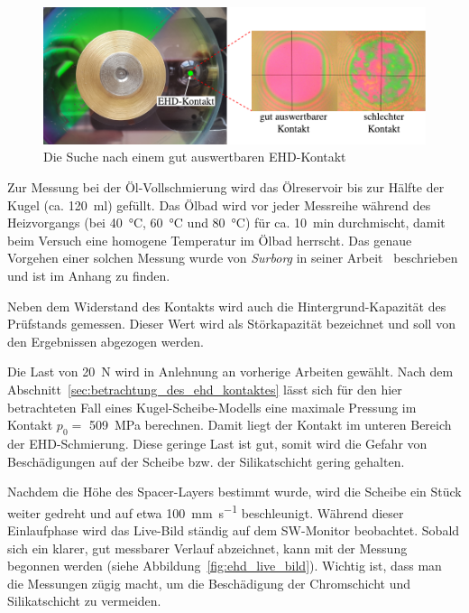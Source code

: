 \begin{figure}[htb]
    \centering
    \includegraphics[]{./images/suche_nach_ehd_kontakt.pdf}
    \caption{Die Suche nach einem gut auswertbaren EHD-Kontakt}
    \label{fig:suche_nach_ehd_kontakt}
\end{figure}

Zur Messung bei der Öl-Vollschmierung wird das Ölreservoir bis zur Hälfte der Kugel (ca. \SI{120}{\ml}) gefüllt.
Das Ölbad wird vor jeder Messreihe während des Heizvorgangs (bei \SI{40}{\degreeCelsius}, \SI{60}{\degreeCelsius} und \SI{80}{\degreeCelsius}) für ca. \SI{10}{\minute} durchmischt, damit beim Versuch eine homogene Temperatur im Ölbad herrscht.
Das genaue Vorgehen einer solchen Messung wurde von \textit{Surborg} in seiner Arbeit~\cite{surborg_2007} beschrieben und ist im Anhang zu finden.

Neben dem Widerstand des Kontakts wird auch die Hintergrund-Kapazität des Prüfstands gemessen.
Dieser Wert wird als Störkapazität bezeichnet und soll von den Ergebnissen abgezogen werden.

Die Last von \SI{20}{\newton} wird in Anlehnung an vorherige Arbeiten gewählt.
Nach dem Abschnitt~\ref{sec:betrachtung_des_ehd_kontaktes} lässt sich für den hier betrachteten Fall eines Kugel-Scheibe-Modells eine maximale Pressung im Kontakt $p_0 =$ \SI{509}{\mega\pascal} berechnen.
Damit liegt der Kontakt im unteren Bereich der EHD-Schmierung.
Diese geringe Last ist gut, somit wird die Gefahr von Beschädigungen auf der Scheibe bzw. der Silikatschicht gering gehalten.

Nachdem die Höhe des Spacer-Layers bestimmt wurde, wird die Scheibe ein Stück weiter gedreht und auf etwa \SI[per-mode=symbol]{100}{\mm\per\second} beschleunigt.
Während dieser Einlaufphase wird das Live-Bild ständig auf dem SW-Monitor beobachtet.
Sobald sich ein klarer, gut messbarer Verlauf abzeichnet, kann mit der Messung begonnen werden (siehe Abbildung~\ref{fig:ehd_live_bild}).
Wichtig ist, dass man die Messungen zügig macht, um die Beschädigung der Chromschicht und Silikatschicht zu vermeiden.

